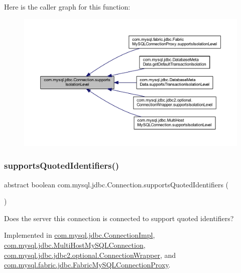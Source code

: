 Here is the caller graph for this function\+:\nopagebreak
\begin{figure}[H]
\begin{center}
\leavevmode
\includegraphics[width=350pt]{interfacecom_1_1mysql_1_1jdbc_1_1_connection_aea32f547f2d12d07de7792a6cdb20585_icgraph}
\end{center}
\end{figure}
\mbox{\label{interfacecom_1_1mysql_1_1jdbc_1_1_connection_a16e68907781a09083ff1afda25dff502}} 
\subsubsection{\texorpdfstring{supports\+Quoted\+Identifiers()}{supportsQuotedIdentifiers()}}
{\footnotesize\ttfamily abstract boolean com.\+mysql.\+jdbc.\+Connection.\+supports\+Quoted\+Identifiers (\begin{DoxyParamCaption}{ }\end{DoxyParamCaption})\hspace{0.3cm}{\ttfamily [abstract]}}

Does the server this connection is connected to support quoted identifiers? 

Implemented in \mbox{\hyperlink{classcom_1_1mysql_1_1jdbc_1_1_connection_impl_a0deb8354645d646aae3867f050d9b42e}{com.\+mysql.\+jdbc.\+Connection\+Impl}}, \mbox{\hyperlink{classcom_1_1mysql_1_1jdbc_1_1_multi_host_my_s_q_l_connection_af49bebe337318800930bddf6351d53f2}{com.\+mysql.\+jdbc.\+Multi\+Host\+My\+S\+Q\+L\+Connection}}, \mbox{\hyperlink{classcom_1_1mysql_1_1jdbc_1_1jdbc2_1_1optional_1_1_connection_wrapper_aee329f3049dfe677c6baa7454004bd2a}{com.\+mysql.\+jdbc.\+jdbc2.\+optional.\+Connection\+Wrapper}}, and \mbox{\hyperlink{classcom_1_1mysql_1_1fabric_1_1jdbc_1_1_fabric_my_s_q_l_connection_proxy_aa4c9ae2613fa025d3498bb4eae8fae8e}{com.\+mysql.\+fabric.\+jdbc.\+Fabric\+My\+S\+Q\+L\+Connection\+Proxy}}.

